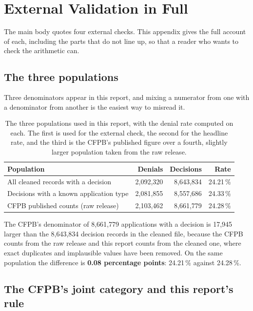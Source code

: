 \documentclass[sigconf,balance=false]{acmart}
\begin{document}
\FloatBarrier

\section{External Validation in Full}\label{app:validation}

The main body quotes four external checks. This appendix gives the full
account of each, including the parts that do not line up, so that a reader
who wants to check the arithmetic can.

\subsection{The three populations}

Three denominators appear in this report, and mixing a numerator from one
with a denominator from another is the easiest way to misread it.

\begin{table}[t]
\caption{The three populations used in this report, with the denial rate
         computed on each. The first is used for the external check, the
         second for the headline rate, and the third is the CFPB's
         published figure over a fourth, slightly larger population taken
         from the raw release.}
\label{tab:populations}
\centering
\footnotesize
\begin{tabular}{@{}lrrr@{}}
\toprule
Population & Denials & Decisions & Rate \\
\midrule
All cleaned records with a decision
  & 2{,}092{,}320 & 8{,}643{,}834 & 24.21\,\% \\
Decisions with a known application type
  & 2{,}081{,}855 & 8{,}557{,}686 & 24.33\,\% \\
CFPB published counts (raw release)
  & 2{,}103{,}462 & 8{,}661{,}779 & 24.28\,\% \\
\bottomrule
\end{tabular}
\end{table}

The CFPB's denominator of 8{,}661{,}779 applications with a decision is
17{,}945 larger than the 8{,}643{,}834 decision records in the cleaned
file, because the CFPB counts from the raw release and this report counts
from the cleaned one, where exact duplicates and implausible values have
been removed. On the same population the difference is \textbf{0.08
percentage points}: 24.21\,\% against 24.28\,\%.

\subsection{The CFPB's joint category and this report's rule}
\end{document}
